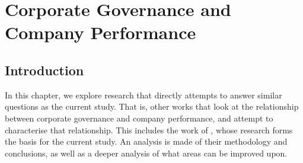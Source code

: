 \section{Corporate Governance and Company Performance}
\subsection{Introduction}
{In this chapter, we explore research that directly attempts to answer similar questions as the current study. That is, other works that look at the relationship between corporate governance and company performance, and attempt to characterise that relationship. This includes the work of \cite{moldovan2015learning}, whose research forms the basis for the current study. An analysis is made of their methodology and conclusions, as well as a deeper analysis of what areas can be improved upon.}
